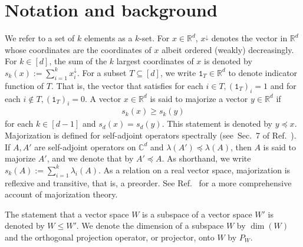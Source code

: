 \documentclass[12pt]{article}
\theoremstyle{definition}
\numberwithin{equation}{section}
\numberwithin{equation}{section}
\newcommand{\la}{\lambda}
\newcommand{\one}{\mathtt{1}}
\newcommand{\da}{\downarrow}
\newcommand{\bC}{\mathbb{C}}
\newcommand{\bR}{\mathbb{R}}
\begin{document}
\section{Notation and background}
\label{sec: prelims}
We refer to a set of \(k\) elements as a \(k\)-set. For \(x \in \bR^{d}\), \(x^{\da}\) denotes the vector in \(\mathbb{R}^{d}\) whose coordinates are the coordinates of \(x\) albeit ordered (weakly) decreasingly. For \(k \in [d]\), the sum of the \(k\) largest coordinates of \(x\) is denoted by \(s_k(x) := \sum_{i=1}^k x_i^\da\).  For a subset \(T \subseteq [d]\), we write \(\one_T \in \bR^d\) to denote indicator function of \(T\). That is, the vector that satisfies for each \(i \in T, (\one_T)_i = 1\) and for each \(i \notin T, (\one_T)_i = 0\). A vector \(x \in \bR^d\) is said to majorize a vector 
\(y \in \bR^d\) if
\begin{align} 
\label{eq: majorization cond}
s_k(x) \geq  s_k(y)
\end{align}
for each \(k \in [d -1]\) and \(s_d(x) = s_d(y)\). This statement is denoted by \(y \preceq x\). Majorization is defined for self-adjoint operators spectrally (see~Sec.~7 of Ref.~\cite{Ando_1989}). If \(A, A'\) are self-adjoint operators on \(\bC^d\) and \(\la(A') \preceq \la(A)\), then \(A\) is said to majorize \(A'\), and we denote that by \(A' \preceq A\).  As shorthand, we write \(s_k(A) := \sum_{i=1}^k \la_i(A)\). As a relation on a real vector space, majorization is reflexive and transitive, that is, a preorder. See Ref.~\cite{Marshall2011} for a more comprehensive account of majorization theory. 



The statement that a vector space \(W\) is a subspace of a vector space \(W'\) is denoted by \(W \leq W'\). We denote the dimension of a subspace \(W\) by \(\dim(W)\) and the orthogonal projection operator, or projector, onto \(W\) by \(P_W\). 
\end{document}
